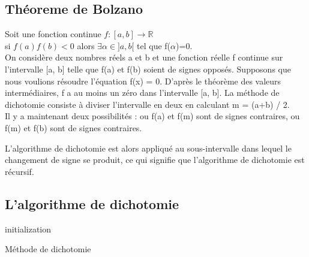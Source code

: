 \documentclass{article}
\newcommand{\R}{\mathbb{R}}
\begin{document}
\subsection{Théoreme de Bolzano}
Soit une fonction continue $ f : [a, b] \to \R $ \\
si $ f(a)f(b) < 0 $  alors $ \exists \alpha \in  ]a, b[ $ tel que f($\alpha$)=0. \\ 


On considère deux nombres réels a et b et une fonction réelle f continue sur l'intervalle [a, b] telle que f(a) et f(b) soient de signes opposés. Supposons que nous voulions résoudre l'équation f(x) = 0. D'après le théorème des valeurs intermédiaires, f a au moins un zéro dans l’intervalle [a, b]. La méthode de dichotomie consiste à diviser l’intervalle en deux en calculant m = (a+b) / 2. \\
Il y a maintenant deux possibilités : ou f(a) et f(m) sont de signes contraires, ou f(m) et f(b) sont de signes contraires.

L’algorithme de dichotomie est alors appliqué au sous-intervalle dans lequel le changement de signe se produit, ce qui signifie que l’algorithme de dichotomie est récursif.
\subsection{L'algorithme de dichotomie}
\begin{algorithm}[H]
\SetAlgoLined
{}
 initialization\;
 \caption{Méthode de dichotomie}
\end{algorithm}

\end{document}
